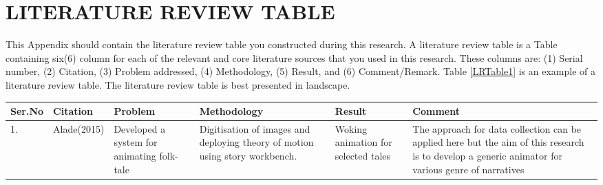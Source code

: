 \chapter{\large LITERATURE REVIEW TABLE}

This Appendix should contain the literature review table you constructed during this research. A literature review table is a Table containing six(6) column for each of the relevant and core literature sources that you used in this research. These columns are: (1) Serial number, (2) Citation, (3) Problem addressed, (4) Methodology, (5) Result, and (6)
Comment/Remark. Table \ref{LRTable1} is an example of a literature review table. The literature review table is best presented in landscape.

\begin{sidewaystable}%
\caption{Literature Review Table}
\begin{tabular}{|p{1.1cm}|p{3.0cm}|p{3.5cm}| p{4.5cm}| p{4.5cm} | p{6.0cm}|} \hline \hline
Ser.No & Citation & Problem & Methodology & Result & Comment \\ \hline
1. & Alade(2015) & Developed a system for animating folk-tale & Digitisation of images and deploying theory of motion using story workbench. & Woking animation for selected tales & The approach for data collection can be applied here but the aim of this research is to develop a generic animator for various genre of narratives \\ \hline \hline	
\end{tabular}
\label{LRTable1}
\end{sidewaystable}

